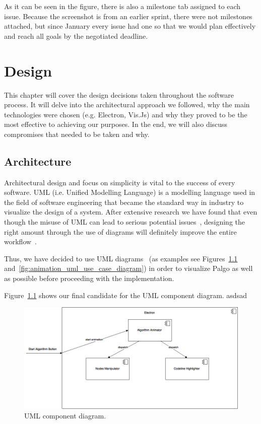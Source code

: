 \documentclass{l4proj}
\begin{document}
As it can be seen in the figure, there is also a milestone tab assigned to each issue. Because the screenshot is
from an earlier sprint, there were not milestones attached, but since January every issue had one so that we
would plan effectively and reach all goals by the negotiated deadline.


\chapter{Design}
\label{design}

This chapter will cover the design decisions taken throughout the software process. It will delve into the
architectural approach we followed, why the main
technologies were chosen (e.g. Electron, Vis.Js) and why they proved to be the most effective to achieving
our purposes. In the end, we will also discuss compromises that needed to be taken and why.

\section{Architecture}

Architectural design and focus on simplicity is vital to the success of every software. UML (i.e. Unified Modelling
Language) is a modelling language used in the field of software engineering that became the standard way in industry to
visualize the design of a system. After extensive research we have found that even though the misuse of UML can lead to
serious potential issues~\cite{boeing-uml-issue}, designing the right amount through the use of diagrams will
definitely improve the entire workflow~\cite{uml-success-stories}.

Thus, we have decided to use UML diagrams~\cite{uml-diagrams-book} (as examples see Figures~\ref{fig:uml-component-diagram} and~\ref{fig:animation_uml_use_case_diagram}) in order to visualize Palgo as well as possible before proceeding with the implementation. 

Figure~\ref{fig:uml-component-diagram} shows our final candidate for the UML component diagram. asdsad

\begin{figure}[!ht]
    \centering
    \includegraphics[scale=0.45]{UML_component_diagram}
    \caption{UML component diagram.}
    \label{fig:uml-component-diagram}
\end{figure}
\end{document}
